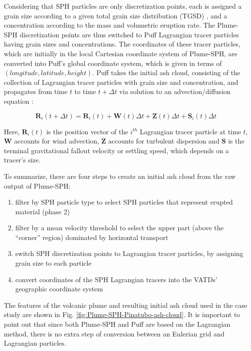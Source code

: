 \documentclass[utf8]{frontiersSCNS} %
\begin{document}
Considering that SPH particles are only discretization points, each is assigned a grain size according to a given total grain size distribution (TGSD) \citep{paladio1996tephra}, and a concentration according to the mass and volumetric eruption rate. The Plume-SPH discretization points are thus switched to Puff Lagrangian tracer particles having grain sizes and concentrations. The coordinates of these tracer particles, which are initially in the local Cartesian coordinate system of Plume-SPH, are converted into Puff's global coordinate system, which is given in terms of $(longitude, latitude, height)$. Puff takes the initial ash cloud, consisting of the collection of Lagrangian tracer particles with grain size and concentration, and propagates from time $t$ to time $t+\Delta t$ via solution to an advection/diffusion equation \citep{searcy1998puff}:
\begin{linenomath*}
\begin{equation}
\textbf{R}_i(t+\Delta t) = \textbf{R}_i(t) + \textbf{W}(t)\Delta t + \textbf{Z}(t)\Delta t + \textbf{S}_i(t) \Delta t
\end{equation}
\end{linenomath*}
Here, $\textbf{R}_i(t)$ is the position vector of the $i^{th}$ Lagrangian tracer particle at time $t$, $\textbf{W}$ accounts for wind advection, $\textbf{Z}$ accounts for turbulent dispersion and $\textbf{S}$ is the terminal gravitational fallout velocity or settling speed, which depends on a tracer's size.

To summarize, there are four steps to create an initial ash cloud from the raw output of Plume-SPH:
\begin{enumerate}
\item filter by SPH particle type to select SPH particles that represent erupted material (phase 2)
\item filter by a mean velocity threshold to select the upper part (above the ``corner'' region) dominated by horizontal transport
\item switch SPH discretization points to Lagrangian tracer particles, by assigning grain size to each particle
\item convert coordinates of the SPH Lagrangian tracers into the VATDs' geographic coordinate system
\end{enumerate}
The features of the volcanic plume and resulting initial ash cloud used in the case study are shown in Fig. \ref{fig:Plume-SPH-Pinatubo-ash-cloud}. It is important to point out that since both Plume-SPH and Puff are based on the Lagrangian method, there is no extra step of conversion between an Eulerian grid and Lagrangian particles.
\end{document}
